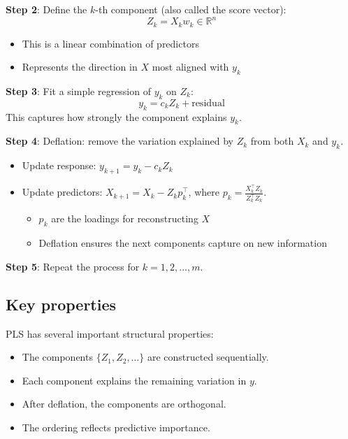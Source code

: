 \documentclass[
  letterpaper,
  DIV=11,
  numbers=noendperiod]{scrreprt}
\providecommand{\tightlist}{%
  \setlength{\itemsep}{0pt}\setlength{\parskip}{0pt}}
\newcommand{\resid}{\mathrm{residual}}
\theoremstyle{definition}
\theoremstyle{definition}
\theoremstyle{plain}
\theoremstyle{plain}
\theoremstyle{remark}
\begin{document}
\textbf{Step 2}: Define the \(k\)-th component (also called the score
vector): \[
Z_k=X_kw_k\in\mathbb R^n
\]

\begin{itemize}
\tightlist
\item
  This is a linear combination of predictors
\item
  Represents the direction in \(X\) most aligned with \(y_k\)
\end{itemize}

\textbf{Step 3}: Fit a simple regression of \(y_k\) on \(Z_k\): \[
y_k=c_kZ_k+\resid
\] This captures how strongly the component explains \(y_k\).

\textbf{Step 4}: Deflation: remove the variation explained by \(Z_k\)
from both \(X_k\) and \(y_k\).

\begin{itemize}
\tightlist
\item
  Update response: \(y_{k+1}=y_k-c_kZ_k\)
\item
  Update predictors: \(X_{k+1}=X_k-Z_kp_k^\top\), where
  \(p_k=\frac{X_k^\top Z_k}{Z_k^\top Z_k}\).

  \begin{itemize}
  \tightlist
  \item
    \(p_k\) are the loadings for reconstructing \(X\)
  \item
    Deflation ensures the next components capture on new information
  \end{itemize}
\end{itemize}

\textbf{Step 5}: Repeat the process for \(k = 1, 2, \dots, m\).

\subsection{Key properties}\label{key-properties}

PLS has several important structural properties:

\begin{itemize}
\tightlist
\item
  The components \(\{Z_1, Z_2, \dots\}\) are constructed sequentially.\\
\item
  Each component explains the remaining variation in \(y\).\\
\item
  After deflation, the components are orthogonal.\\
\item
  The ordering reflects predictive importance.
\end{itemize}
\end{document}
